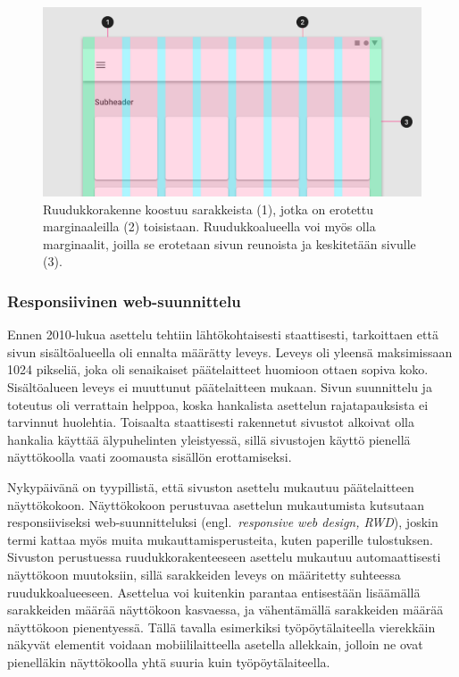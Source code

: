 \documentclass[finnish, 12pt, a4paper, elec, utf8, a-1b]{aaltothesis}
\begin{document}
\begin{figure}[h]
    \centering
    \includegraphics[width=\textwidth]{images/grid-layout.png}
    \caption{Ruudukkorakenne koostuu sarakkeista (1), jotka on erotettu
    marginaaleilla (2) toisistaan. Ruudukkoalueella voi myös olla
    marginaalit, joilla se erotetaan sivun reunoista ja keskitetään sivulle
    (3).~\cite{material-design-grid}~\label{fig:grid-layout}}
\end{figure}

\subsubsection{Responsiivinen web-suunnittelu}\label{responsive-web-design}

Ennen 2010-lukua asettelu tehtiin lähtökohtaisesti staattisesti, tarkoittaen
että sivun sisältöalueella oli ennalta määrätty leveys. Leveys oli yleensä
maksimissaan 1024 pikseliä, joka oli senaikaiset päätelaitteet huomioon ottaen
sopiva koko. Sisältöalueen leveys ei muuttunut päätelaitteen mukaan. Sivun
suunnittelu ja toteutus oli verrattain helppoa, koska hankalista asettelun
rajatapauksista ei tarvinnut huolehtia. Toisaalta staattisesti rakennetut
sivustot alkoivat olla hankalia käyttää älypuhelinten yleistyessä, sillä
sivustojen käyttö pienellä näyttökoolla vaati zoomausta sisällön erottamiseksi.

Nykypäivänä on tyypillistä, että sivuston asettelu mukautuu päätelaitteen
näyttökokoon. Näyttökokoon perustuvaa asettelun mukautumista kutsutaan
responsiiviseksi web-suunnitteluksi (engl.~\textit{responsive web design, RWD}),
joskin termi kattaa myös muita mukauttamisperusteita, kuten paperille
tulostuksen. Sivuston perustuessa ruudukkorakenteeseen asettelu mukautuu
automaattisesti näyttökoon muutoksiin, sillä sarakkeiden leveys on määritetty
suhteessa ruudukkoalueeseen. Asettelua voi kuitenkin parantaa entisestään
lisäämällä sarakkeiden määrää näyttökoon kasvaessa, ja vähentämällä sarakkeiden
määrää näyttökoon pienentyessä. Tällä tavalla esimerkiksi työpöytälaiteella
vierekkäin näkyvät elementit voidaan mobiililaitteella asetella allekkain,
jolloin ne ovat pienelläkin näyttökoolla yhtä suuria kuin työpöytälaiteella.
\end{document}
